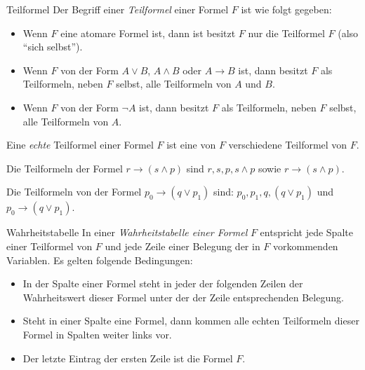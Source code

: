 \begin{definition}{Teilformel}
    Der Begriff einer \textit{Teilformel} einer Formel $F$ ist wie folgt gegeben:
    \begin{itemize}
        \item Wenn $F$ eine atomare Formel ist, dann ist besitzt $F$ nur die Teilformel $F$ (also ``sich selbst'').
        \item Wenn $F$ von der Form $A\lor B$, $A\land B$ oder $A\to B$ ist, dann besitzt $F$ als Teilformeln, neben $F$ selbst, alle Teilformeln von $A$ und $B$.
        \item Wenn $F$ von der Form $\neg A$ ist, dann besitzt $F$ als Teilformeln, neben $F$ selbst, alle Teilformeln von $A$.
    \end{itemize}
    Eine \textit{echte} Teilformel einer Formel $F$ ist eine von $F$ verschiedene Teilformel von $F$.
\end{definition}

\begin{example}
    Die Teilformeln der Formel $r\to (s\land p)$ sind $r,s,p,s\land p$ sowie $r\to (s\land p)$.
\end{example}

\begin{example}
    Die Teilformeln von der Formel $p_0\to (q\lor p_1)$ sind: $p_0,p_1,q,(q\lor p_1)$ und $p_0\to (q\lor p_1)$.
\end{example}

\begin{definition}{Wahrheitstabelle}
    In einer \textit{Wahrheitstabelle einer Formel} $F$ entspricht jede Spalte einer Teilformel von $F$ und jede Zeile einer Belegung der in $F$ vorkommenden Variablen. Es gelten folgende Bedingungen:
    \begin{itemize}
        \item In der Spalte einer Formel steht in jeder der folgenden Zeilen der Wahrheitswert dieser Formel unter der der Zeile entsprechenden Belegung.
        \item Steht in einer Spalte eine Formel, dann kommen alle echten Teilformeln dieser Formel in Spalten weiter links vor.
        \item Der letzte Eintrag der ersten Zeile ist die Formel $F$.
    \end{itemize}
\end{definition}

